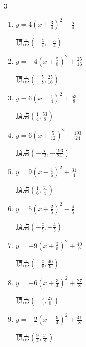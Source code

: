 \begin{multicols}{3}
\begin{enumerate}
        $\displaystyle 頂点\left( -\frac{9}{8} , -\frac{145}{16} \right)$

  \item $\displaystyle y=4\left( x+\frac{3}{4}\right)^{2}-\frac{5}{4}$

        $\displaystyle 頂点\left( -\frac{3}{4} , -\frac{5}{4} \right)$

  \item $\displaystyle y=-4\left( x+\frac{5}{8}\right)^{2}+\frac{25}{16}$

        $\displaystyle 頂点\left( -\frac{5}{8} , \frac{25}{16} \right)$

  \item $\displaystyle y=6\left( x-\frac{1}{4}\right)^{2}+\frac{53}{8}$

        $\displaystyle 頂点\left( \frac{1}{4} , \frac{53}{8} \right)$

  \item $\displaystyle y=6\left( x+\frac{5}{12}\right)^{2}-\frac{193}{24}$

        $\displaystyle 頂点\left( -\frac{5}{12} , -\frac{193}{24} \right)$

  \item $\displaystyle y=9\left( x-\frac{1}{6}\right)^{2}+\frac{31}{4}$

        $\displaystyle 頂点\left( \frac{1}{6} , \frac{31}{4} \right)$

\columnbreak %

\resetques

  \item $\displaystyle y=5\left( x+\frac{2}{5}\right)^{2}-\frac{4}{5}$

        $\displaystyle 頂点\left( -\frac{2}{5} , -\frac{4}{5} \right)$

  \item $\displaystyle y=-9\left( x+\frac{2}{9}\right)^{2}+\frac{40}{9}$

        $\displaystyle 頂点\left( -\frac{2}{9} , \frac{40}{9} \right)$

  \item $\displaystyle y=-6\left( x+\frac{3}{4}\right)^{2}+\frac{27}{8}$

        $\displaystyle 頂点\left( -\frac{3}{4} , \frac{27}{8} \right)$

  \item $\displaystyle y=-2\left( x-\frac{9}{4}\right)^{2}+\frac{41}{8}$

        $\displaystyle 頂点\left( \frac{9}{4} , \frac{41}{8} \right)$


\end{enumerate}
\end{multicols}
